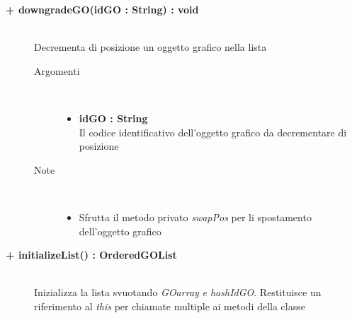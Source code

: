 \begin{description}
\begin{description}
\begin{description}
\begin{itemize}
			\end{itemize}
		\end{description}
	\end{description}
	
	\begin{description}
		\item[\textbf{\color{blue}+ downgradeGO(idGO : String) : void			}] \hfill \\
			Decrementa di posizione un oggetto grafico nella lista
			
		\begin{description}
			\item[Argomenti] \hfill \\
				\begin{itemize}
				
					\item \textbf{idGO : String			} \hfill \\
					Il codice identificativo dell'oggetto grafico da decrementare di posizione
					
				\end{itemize}
				
			\item[Note] \hfill \\
			\begin{itemize}
					\item Sfrutta il metodo privato \textit{swapPos} per li spostamento dell'oggetto grafico
					
			\end{itemize}
		\end{description}
	\end{description}
	
	\begin{description}
		\item[\textbf{\color{blue}+ initializeList() : OrderedGOList			}] \hfill \\
			Inizializza la lista svuotando \textit{GOarray} \textit{e hashIdGO}. Restituisce un riferimento al \textit{this} per chiamate multiple ai metodi della classe 
			
	\end{description}
	
		
	

\end{description}






























